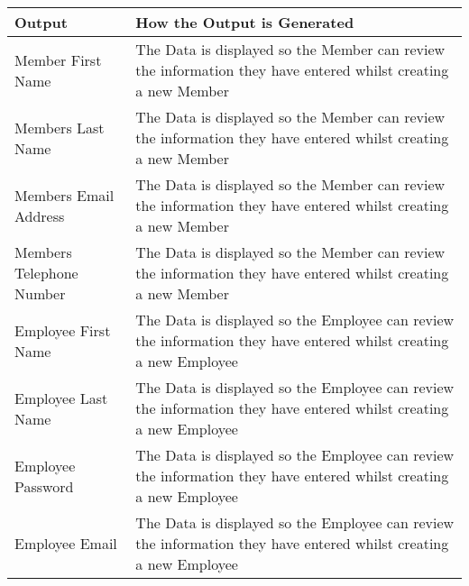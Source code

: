 \begin{python}
  \begin{tabular}{|p{4cm}|p{4cm}|}
        \hline
	\textbf{Output} & \textbf{ How the Output is Generated}\\ \hline
	{Member First Name} & {The Data is displayed so the Member can review the information they have entered whilst creating a new Member}\\ \hline
	{Members Last Name} & {The Data is displayed so the Member can review the information they have entered whilst creating a new Member}\\ \hline
	{Members Email Address} & {The Data is displayed so the Member can review the information they have entered whilst creating a new Member}\\ \hline
	{Members Telephone Number} & {The Data is displayed so the Member can review the information they have entered whilst creating a new Member}\\ \hline
	{Employee First Name} & {The Data is displayed so the Employee can review the information they have entered whilst creating a new Employee}\\ \hline
	{Employee Last Name} & {The Data is displayed so the Employee can review the information they have entered whilst creating a new Employee}\\ \hline
	{Employee Password} & {The Data is displayed so the Employee can review the information they have entered whilst creating a new Employee}\\ \hline
	{Employee Email} & {The Data is displayed so the Employee can review the information they have entered whilst creating a new Employee}\\ \hline
	\end{tabular}
	

\end{python}
